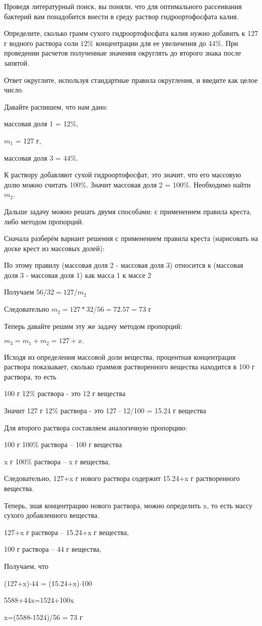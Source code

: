 
Проведя литературный поиск, вы поняли, что для оптимального рассеивания бактерий вам понадобится 
внести в среду раствор гидроортофосфата калия.

Определите, сколько грамм сухого гидроортофосфата калия нужно добавить к 127 г водного раствора соли $12\%$ 
концентрации для ее увеличения до $44\%$. При проведении расчетов полученные значения округлять до 
второго знака после запятой.

Ответ округлите, используя стандартные правила округления, и введите как целое число.

\solutionSection

Давайте распишем, что нам дано:

массовая доля 1 = 12\%,

$m_1$ = 127 г,

массовая доля 3 = 44\%.

К раствору добавляют сухой гидроортофосфат, это значит, что его массовую долю можно считать 100\%. Значит массовая доля 2 = 100\%. Необходимо найти $m_2$. 

Дальше задачу можно решать двумя способами: с применением правила креста, либо методом пропорций.

Сначала разберём вариант решения с применением правила креста (нарисовать на доске крест из массовых долей):


По этому правилу 
(массовая доля 2 - массовая доля 3) относится к (массовая доля 3 - массовая доля 1) как масса 1 к массе 2

Получаем $56/32 = 127/m_2$

Следовательно $m_2 = 127*32/56 = 72.57=73$ г

Теперь давайте решим эту же задачу методом пропорций:

$m_3 = m_1 + m_2 = 127 + x.$

Исходя из определения массовой доли вещества, процентная концентрация раствора показывает, сколько граммов растворенного вещества находится 
в 100 г раствора, то есть 

100 г 12\% раствора - это 12 г вещества

Значит 127 г 12\% раствора - это 127 $\cdot$ 12/100 = 15.24 г вещества

Для второго раствора составляем аналогичную пропорцию:

100 г 100\% раствора – 100 г вещества

x г 100\% раствора – x г вещества,

Следовательно, 127+x г нового раствора содержит 15.24+x г растворенного вещества.

Теперь, зная концентрацию нового раствора, можно определить x, то есть массу сухого добавленного вещества.

127+x г раствора – 15.24+x г вещества,

100 г раствора – 44 г вещества,

Получаем, что

(127+x)$\cdot$44 = (15.24+x)$\cdot$100

5588+44x=1524+100x

x=(5588-1524)/56 = 73 г

